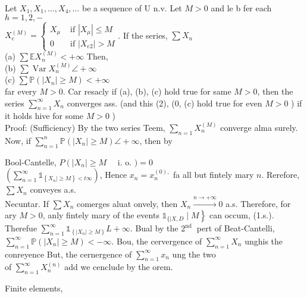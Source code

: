 \documentclass{amsbook}
\theoremstyle{plain}%
\theoremstyle{definition}
\theoremstyle{remark}
\begin{document}
Let $X_{1}, X_{1}, \ldots, X_{4}, \ldots$ be a sequence of U n.v. Let $M>0$ and le b fer each $h=1,2,-$\\
$X_{e}^{(M)}=\left\{
\begin{array}{ll}X_{\mu} & \text { if }\left|X_{\mu}\right| \leqslant M \\ 0 & \text { if }\left|X_{e 2}\right|>M
\end{array}\right.$. If the series, $\sum X_{n}$\\
(a) $\sum \mathbb{E} X_{n}^{(M)}<+\infty$ Then,\\
(b) $\sum \operatorname{Var} X_{n}^{(M)} \angle+\infty$\\
(c) $\sum \mathbb{P}\left(\left|X_{n}\right| \geqslant M\right)<+\infty$\\
far every $M>0$. Car resacly if (a), (b), (c) hold true for same $M>0$, then the series $\sum_{n=1}^{\infty} X_{n}$ converges ass. (and this (2), (0, (c) hold true for even $M>0$ ) if it holds hive for some $M>0$ )\\
Proof: (Sufficiency) By the two series Teem, $\sum_{n=1} X_{n}^{(M)}$ converge alma surely.\\
Now, if $\sum_{n=1}^{n} \mathbb{P}\left(\left|X_{n}\right| \geqslant M\right) \angle+\infty$, then by

Bool-Cantelle, $P\left(\left|X_{n}\right| \geqslant M \quad\right.$ i. o. $)=0$\\
$\left(\sum_{n=1}^{\infty} \mathbb{1}_{\left\{X_{n} \mid \geqslant M\right\}<t \infty}\right)$, Hence $x_{n}=x_{n}^{(0),}$ fa all but fintely mary $n$. Rerefore, $\sum X_{n}$ conveyes a.s.\\
Necuntar. If $\sum X_{n}$ comerges aluat onvely, then $X_{n} \xrightarrow{n \rightarrow+\infty} 0$ a.s. Therefore, for ary $M>0$, anly fintely mary of the events $\left.\mathbb{1}_{\{\mid X, D} \mid M\right\}$ can occum, (1.s.). Therefue $\sum_{n=1}^{\infty} \mathbb{1}_{\left\{\left|X_{n}\right| \geqslant M\right\}} L+\infty$. Bual by the $2^{\text {nd }}$ pert of Beat-Cantelli, $\sum_{n=1}^{\infty} \mathbb{P}\left(\left|X_{n}\right| \geqslant M\right)<-\infty$. Bou, the cervergence of $\sum_{n=1}^{\infty} X_{n}$ unghis the conreyence But, the cernergence of $\sum_{n=1}^{\infty} x_{n}$ ung the two\\
of $\sum_{n=1}^{\infty} X_{n}^{(n)}$ add we cenclude by the orem.

Finite elements,
\end{document}
